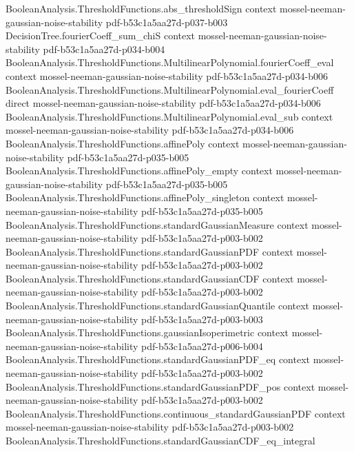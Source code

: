 \begin{theorem}
  {BooleanAnalysis.ThresholdFunctions.abs_thresholdSign}
  {context}
  {mossel-neeman-gaussian-noise-stability}
  {pdf-b53c1a5aa27d-p037-b003}
\proofstep
  {DecisionTree.fourierCoeff_sum_chiS}
  {context}
  {mossel-neeman-gaussian-noise-stability}
  {pdf-b53c1a5aa27d-p034-b004}
\proofstep
  {BooleanAnalysis.ThresholdFunctions.MultilinearPolynomial.fourierCoeff_eval}
  {context}
  {mossel-neeman-gaussian-noise-stability}
  {pdf-b53c1a5aa27d-p034-b006}
\proofstep
  {BooleanAnalysis.ThresholdFunctions.MultilinearPolynomial.eval_fourierCoeff}
  {direct}
  {mossel-neeman-gaussian-noise-stability}
  {pdf-b53c1a5aa27d-p034-b006}
\proofstep
  {BooleanAnalysis.ThresholdFunctions.MultilinearPolynomial.eval_sub}
  {context}
  {mossel-neeman-gaussian-noise-stability}
  {pdf-b53c1a5aa27d-p034-b006}
\proofstep
  {BooleanAnalysis.ThresholdFunctions.affinePoly}
  {context}
  {mossel-neeman-gaussian-noise-stability}
  {pdf-b53c1a5aa27d-p035-b005}
\proofstep
  {BooleanAnalysis.ThresholdFunctions.affinePoly_empty}
  {context}
  {mossel-neeman-gaussian-noise-stability}
  {pdf-b53c1a5aa27d-p035-b005}
\proofstep
  {BooleanAnalysis.ThresholdFunctions.affinePoly_singleton}
  {context}
  {mossel-neeman-gaussian-noise-stability}
  {pdf-b53c1a5aa27d-p035-b005}
\proofstep
  {BooleanAnalysis.ThresholdFunctions.standardGaussianMeasure}
  {context}
  {mossel-neeman-gaussian-noise-stability}
  {pdf-b53c1a5aa27d-p003-b002}
\proofstep
  {BooleanAnalysis.ThresholdFunctions.standardGaussianPDF}
  {context}
  {mossel-neeman-gaussian-noise-stability}
  {pdf-b53c1a5aa27d-p003-b002}
\proofstep
  {BooleanAnalysis.ThresholdFunctions.standardGaussianCDF}
  {context}
  {mossel-neeman-gaussian-noise-stability}
  {pdf-b53c1a5aa27d-p003-b002}
\proofstep
  {BooleanAnalysis.ThresholdFunctions.standardGaussianQuantile}
  {context}
  {mossel-neeman-gaussian-noise-stability}
  {pdf-b53c1a5aa27d-p003-b003}
\proofstep
  {BooleanAnalysis.ThresholdFunctions.gaussianIsoperimetric}
  {context}
  {mossel-neeman-gaussian-noise-stability}
  {pdf-b53c1a5aa27d-p006-b004}
\proofstep
  {BooleanAnalysis.ThresholdFunctions.standardGaussianPDF_eq}
  {context}
  {mossel-neeman-gaussian-noise-stability}
  {pdf-b53c1a5aa27d-p003-b002}
\proofstep
  {BooleanAnalysis.ThresholdFunctions.standardGaussianPDF_pos}
  {context}
  {mossel-neeman-gaussian-noise-stability}
  {pdf-b53c1a5aa27d-p003-b002}
\proofstep
  {BooleanAnalysis.ThresholdFunctions.continuous_standardGaussianPDF}
  {context}
  {mossel-neeman-gaussian-noise-stability}
  {pdf-b53c1a5aa27d-p003-b002}
\proofstep
  {BooleanAnalysis.ThresholdFunctions.standardGaussianCDF_eq_integral}

\end{theorem}
